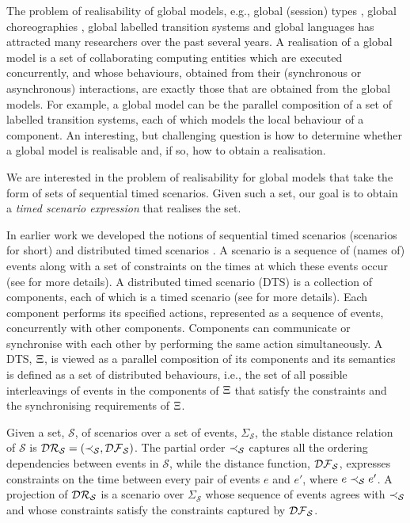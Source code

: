 The problem of realisability of global models, e.g., global (session)
types \cite{BEJLERI-2009,Castagna-2011,Honda-2016,Hans-2016}, global
choreographies \cite{Franco-2022}, global labelled transition
systems \cite{Beek-2023} and global languages
has attracted many researchers over the past several years.
A realisation of a global model is a set of
collaborating computing entities which
are executed concurrently, and whose behaviours, obtained from their
(synchronous or asynchronous) interactions, are exactly those that are
obtained from the global models.
For example, a global model can be the parallel composition of a set
of labelled transition systems, each of which models the local
behaviour of a component.
An interesting, but challenging question is how to determine whether a
global model is realisable and, if so, how to obtain a realisation.

We are interested in the problem of realisability for global
models that take the form of sets of sequential timed
scenarios. Given such a set, our goal is to
obtain a \emph{timed scenario expression} that realises the set.

In earlier work we developed the notions of sequential
timed scenarios (scenarios for short) \cite{neda-2018-2} and
distributed timed scenarios \cite{DTS-2025}.
A scenario is a sequence of (names of) events along with a set of
constraints on the times at which these events occur
(see  for more details).
A distributed timed scenario (DTS) is a collection of
components, each of which is a timed
scenario (see  for more details).
Each component performs its specified actions, represented as a
sequence of events, concurrently with
other components. Components can communicate or
synchronise with each other by performing the same action
simultaneously.
A DTS, $\Xi$, is viewed as a parallel composition of its components and its
semantics is defined as a set of distributed behaviours, i.e., the set
of all possible interleavings of events in the components of
$\Xi$ that satisfy the constraints and the synchronising
requirements of $\Xi$.

Given a set, $\mathcal{S}$, of scenarios over a set of events,
$\Sigma_{\mathcal{S}}$,
the stable distance relation \cite{DTS-2025} of $\mathcal{S}$
is $\mathcal{DR}_{\mathcal{S}}=(\prec_{\mathcal{S}},\mathcal{DF}_{\mathcal{S}})$.
The partial order $\prec_{\mathcal{S}}$
captures all the ordering dependencies between events in
$\mathcal{S}$, while the distance function, $\mathcal{DF}_{\mathcal{S}}$,
expresses constraints on the time between
every pair of events $e$ and $e'$,
where $e\prec_{\mathcal{S}}e'$. A projection of
$\mathcal{DR}_{\mathcal{S}}$ is a scenario over $\Sigma_{\mathcal{S}}$ whose
sequence of events agrees with
$\prec_{\mathcal{S}}$ and whose constraints satisfy
the constraints captured by $\mathcal{DF}_{\mathcal{S}}$.


